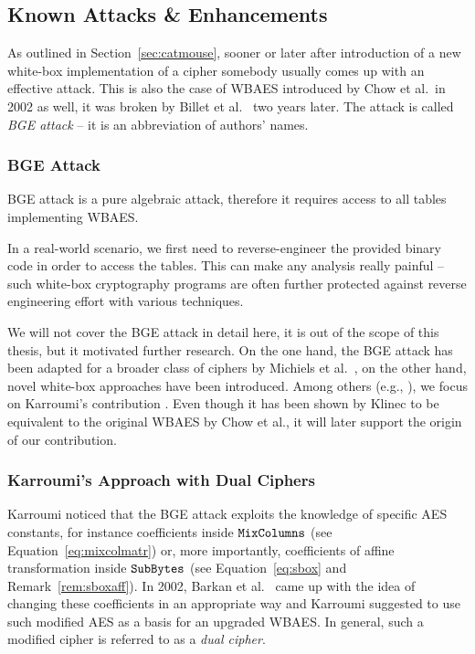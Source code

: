 \subsection{Known Attacks \& Enhancements}
\label{sec:known}

As outlined in Section~\ref{sec:catmouse}, sooner or later after introduction of a new white-box implementation of a cipher somebody usually comes up with an effective attack. This is also the case of WBAES introduced by Chow et al.\ in 2002 as well, it was broken by Billet et al.\ \cite{billet2004cryptanalysis} two years later. The attack is called {\em BGE attack} -- it is an abbreviation of authors' names.

\subsubsection{BGE Attack}
	
	BGE attack is a pure algebraic attack, therefore it requires access to all tables implementing WBAES.
	
	\begin{note}
	\label{note:reverse}
		In a real-world scenario, we first need to reverse-engineer the provided binary code in order to access the tables. This can make any analysis really painful -- such white-box cryptography programs are often further protected against reverse engineering effort with various techniques.
	\end{note}
	
	We will not cover the BGE attack in detail here, it is out of the scope of this thesis, but it motivated further research. On the one hand, the BGE attack has been adapted for a broader class of ciphers by Michiels et al.\ \cite{michiels2008cryptanalysis}, on the other hand, novel white-box approaches have been introduced. Among others (e.g., \cite{michiels2007cryptographic, xiao2009secure}), we focus on Karroumi's contribution \cite{karroumi2010protecting}. Even though it has been shown by Klinec \cite{klinec2013white} to be equivalent to the original WBAES by Chow et al., it will later support the origin of our contribution.

\subsubsection{Karroumi's Approach with Dual Ciphers}
	
	Karroumi noticed that the BGE attack exploits the knowledge of specific AES constants, for instance coefficients inside $\texttt{MixColumns}$ (see Equation~\ref{eq:mixcolmatr}) or, more importantly, coefficients of affine transformation inside $\texttt{SubBytes}$ (see Equation~\ref{eq:sbox} and Remark~\ref{rem:sboxaff}). In 2002, Barkan et al.\ \cite{barkan2002many} came up with the idea of changing these coefficients in an appropriate way and Karroumi suggested to use such modified AES as a basis for an upgraded WBAES. In general, such a modified cipher is referred to as a {\em dual cipher}.
	
